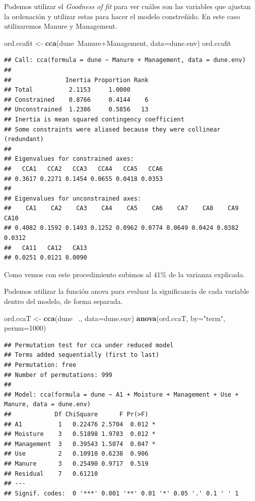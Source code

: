 \documentclass[]{book}
\newenvironment{Shaded}{\begin{snugshade}}{\end{snugshade}}
\newcommand{\KeywordTok}[1]{\textcolor[rgb]{0.13,0.29,0.53}{\textbf{{#1}}}}
\newcommand{\DataTypeTok}[1]{\textcolor[rgb]{0.13,0.29,0.53}{{#1}}}
\newcommand{\DecValTok}[1]{\textcolor[rgb]{0.00,0.00,0.81}{{#1}}}
\newcommand{\StringTok}[1]{\textcolor[rgb]{0.31,0.60,0.02}{{#1}}}
\newcommand{\NormalTok}[1]{{#1}}
\begin{document}
Podemos utilizar el \emph{Goodness of fit} para ver cuáles son las
variables que ajustan la ordenación y utilizar estas para hacer el
modelo constreñido. En este caso utilizaremos Manure y Management.

\begin{Shaded}
\begin{Highlighting}[]
\NormalTok{ord.ccafit <-}\StringTok{ }\KeywordTok{cca}\NormalTok{(dune~Manure+Management, }\DataTypeTok{data=}\NormalTok{dune.env)}
\NormalTok{ord.ccafit}
\end{Highlighting}
\end{Shaded}

\begin{verbatim}
## Call: cca(formula = dune ~ Manure + Management, data = dune.env)
## 
##               Inertia Proportion Rank
## Total          2.1153     1.0000     
## Constrained    0.8766     0.4144    6
## Unconstrained  1.2386     0.5856   13
## Inertia is mean squared contingency coefficient 
## Some constraints were aliased because they were collinear (redundant)
## 
## Eigenvalues for constrained axes:
##   CCA1   CCA2   CCA3   CCA4   CCA5   CCA6 
## 0.3617 0.2271 0.1454 0.0655 0.0418 0.0353 
## 
## Eigenvalues for unconstrained axes:
##    CA1    CA2    CA3    CA4    CA5    CA6    CA7    CA8    CA9   CA10 
## 0.4082 0.1592 0.1493 0.1252 0.0962 0.0774 0.0649 0.0424 0.0382 0.0312 
##   CA11   CA12   CA13 
## 0.0251 0.0121 0.0090
\end{verbatim}

Como vemos con este procedimiento subimos al 41\% de la varianza
explicada.

Podemos utilizar la función anova para evaluar la significancia de cada
variable dentro del modelo, de forma separada.

\begin{Shaded}
\begin{Highlighting}[]
\NormalTok{ord.ccaT <-}\StringTok{ }\KeywordTok{cca}\NormalTok{(dune~}\StringTok{ }\NormalTok{., }\DataTypeTok{data=}\NormalTok{dune.env)}
\KeywordTok{anova}\NormalTok{(ord.ccaT, }\DataTypeTok{by=}\StringTok{"term"}\NormalTok{, }\DataTypeTok{permu=}\DecValTok{1000}\NormalTok{)}
\end{Highlighting}
\end{Shaded}

\begin{verbatim}
## Permutation test for cca under reduced model
## Terms added sequentially (first to last)
## Permutation: free
## Number of permutations: 999
## 
## Model: cca(formula = dune ~ A1 + Moisture + Management + Use + Manure, data = dune.env)
##            Df ChiSquare      F Pr(>F)  
## A1          1   0.22476 2.5704  0.012 *
## Moisture    3   0.51898 1.9783  0.012 *
## Management  3   0.39543 1.5074  0.047 *
## Use         2   0.10910 0.6238  0.906  
## Manure      3   0.25490 0.9717  0.519  
## Residual    7   0.61210                
## ---
## Signif. codes:  0 '***' 0.001 '**' 0.01 '*' 0.05 '.' 0.1 ' ' 1
\end{verbatim}
\end{document}
